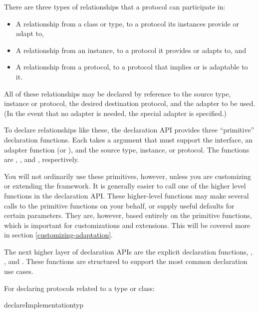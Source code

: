 \begin{verbatim%
}
\begin{verbatim%
}
\begin{verbatim%
}
\begin{verbatim%
}
There are three types of relationships that a protocol can participate in:

\begin{itemize}
\item A relationship from a class or type, to a protocol its instances provide
or adapt to,

\item A relationship from an instance, to a protocol it provides or adapts to,
and

\item A relationship from a protocol, to a protocol that implies or is adaptable
to it.
\end{itemize}

All of these relationships may be declared by reference to the source type,
instance or protocol, the desired destination protocol, and the adapter to be
used. (In the event that no adapter is needed, the special adapter
 is specified.)

To declare relationships like these, the  declaration API
provides three ``primitive'' declaration functions.  Each takes a 
argument that must support the  interface, an
adapter function (or ), and the source
type, instance, or protocol.  The functions are
, , and
, respectively.

You will not ordinarily use these primitives, however, unless you are
customizing or extending the framework.  It is generally easier to call one
of the higher level functions in the declaration API.  These higher-level
functions may make several calls to the primitive functions on your behalf, or
supply useful defaults for certain parameters.  They are, however, based
entirely on the primitive functions, which is important for customizations and
extensions.  This will be covered more in section \ref{customizing-adaptation}.

The next higher layer of declaration APIs are the explicit declaration
functions, , , and
.  These functions are structured to support the most
common declaration use cases.

For declaring protocols related to a type or class:

\begin{funcdesc}{declareImplementation}{typ
 }


\end{funcdesc}
\end{verbatim%
}
\end{verbatim%
}
\end{verbatim%
}
\end{verbatim%
}
